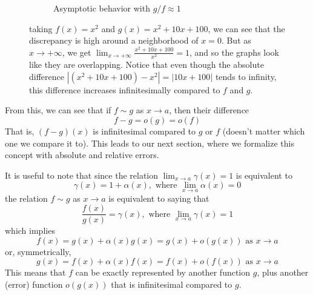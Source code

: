 \begin{example}
\begin{figure}[H]
\begin{subfigure}[b]{0.48\textwidth}
        \caption{Asymptotic behavior with $g/f \approx 1$}
        \label{fig:asymptotic}
      \end{subfigure}
      \caption{taking $f(x) = x^2$ and $g(x) = x^2 + 10x + 100$, we can see that the discrepancy is high around a neighborhood of $x = 0$. But as $x \to +\infty$, we get $\lim_{x \to + \infty} \frac{x^2 + 10x + 100}{x^2} = 1$, and so the graphs look like they are overlapping. Notice that even though the absolute difference $|(x^2 + 10x + 100) - x^2| = |10x + 100|$ tends to infinity, this difference increases infinitesimally compared to $f$ and $g$. }
      \label{fig:function-ratios}
    \end{figure}
  \end{example}

  From this, we can see that if $f \sim g$ as $x \to a$, then their difference 
  \begin{equation}
    f - g = o(g) = o(f)
  \end{equation}
  That is, $(f-g)(x)$ is infinitesimal compared to $g$ or $f$ (doesn't matter which one we compare it to). This leads to our next section, where we formalize this concept with absolute and relative errors. 
  
  It is useful to note that since the relation $\lim_{x \to a} \gamma(x) = 1$ is equivalent to 
  \begin{equation}
    \gamma (x) = 1 + \alpha(x), \text{ where } \lim_{x \to a} \alpha(x) = 0
  \end{equation}
  the relation $f \sim g$ as $x\to a$ is equivalent to saying that
  \begin{equation}
    \frac{f(x)}{g(x)} = \gamma(x), \text{ where } \lim_{x \to a} \gamma(x) = 1
  \end{equation}
  which implies 
  \begin{equation}
    f(x) = g(x) + \alpha(x) g(x) = g(x) + o(g(x)) \text{ as } x \to a
  \end{equation}
  or, symmetrically, 
  \begin{equation}
    g(x) = f(x) + \alpha(x) f(x) = f(x) + o(f(x)) \text{ as } x \to a
  \end{equation}
  This means that $f$ can be exactly represented by another function $g$, plus another (error) function $o(g(x))$ that is infinitesimal compared to $g$. 

